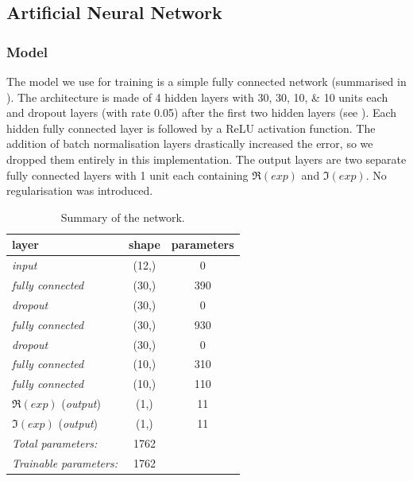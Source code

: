 \subsection{Artificial Neural Network}

\subsubsection{Model}

The model we use for training is a simple fully connected network (summarised in ).
The architecture is made of 4 hidden layers with \numlist{30;30;10;10} units each and dropout layers (with rate \num{0.05}) after the first two hidden layers (see ).
Each hidden fully connected layer is followed by a ReLU activation function.
The addition of batch normalisation layers drastically increased the error, so we dropped them entirely in this implementation.
The output layers are two separate fully connected layers with 1 unit each containing $\Re(exp)$ and $\Im(exp)$.
No regularisation was introduced.

\begin{table}[htbp]
  \centering
  \begin{tabular}{@{}lcc@{}}
    \toprule
    \textbf{layer}               & \textbf{shape} & \textbf{parameters} \\
    \midrule
    \emph{input}                 & (12,)          & 0                   \\
    \emph{fully connected}       & (30,)          & 390                 \\
    \emph{dropout}               & (30,)          & 0                   \\
    \emph{fully connected}       & (30,)          & 930                 \\
    \emph{dropout}               & (30,)          & 0                   \\
    \emph{fully connected}       & (10,)          & 310                 \\
    \emph{fully connected}       & (10,)          & 110                 \\
    $\Re(exp)$ (\emph{output})   & (1,)           & 11                  \\
    $\Im(exp)$ (\emph{output})   & (1,)           & 11                  \\
    \midrule
    \emph{Total parameters:}     & \num{1762}     &                     \\
    \emph{Trainable parameters:} & \num{1762}     &                     \\
    \bottomrule
  \end{tabular}
  \caption{Summary of the network.}
  \label{tab:agg:keras_summary}
\end{table}

